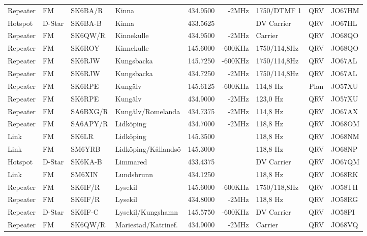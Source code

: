 \begin{longtable}{llllrrlcl}
Repeater & FM     & SK6BA/R  & Kinna               & 434.9500  & -2MHz   & 1750/DTMF 1     & QRV  & JO67HM \\
Hotspot  & D-Star & SK6BA-B  & Kinna               & 433.5625  &         & DV Carrier      & QRV  & JO67HL \\
Repeater & FM     & SK6QW/R  & Kinnekulle          & 434.9500  & -2MHz   & Carrier         & QRV  & JO68QO \\
Repeater & FM     & SK6ROY   & Kinnekulle          & 145.6000  & -600KHz & 1750/114,8Hz    & QRV  & JO68QO \\
Repeater & FM     & SK6RJW   & Kungsbacka          & 145.7250  & -600KHz & 1750/114,8Hz    & QRV  & JO67AL \\
Repeater & FM     & SK6RJW   & Kungsbacka          & 434.7250  & -2MHz   & 1750/114,8Hz    & QRV  & JO67AL \\
Repeater & FM     & SK6RPE   & Kungälv             & 145.6125  & -600KHz & 114,8 Hz        & Plan & JO57XU \\
Repeater & FM     & SK6RPE   & Kungälv             & 434.9000  & -2MHz   & 123,0 Hz        & QRV  & JO57XU \\
Repeater & FM     & SA6BXG/R & Kungälv/Romelanda   & 434.7375  & -2MHz   & 114,8 Hz        & QRV  & JO67AX \\
Repeater & FM     & SA6APY/R & Lidköping           & 434.7000  & -2MHz   & 118,8 Hz        & QRV  & JO68OM \\
Link     & FM     & SK6LR    & Lidköping           & 145.3500  &         & 118,8 Hz        & QRV  & JO68NM \\
Link     & FM     & SM6YRB   & Lidköping/Kållandsö & 145.3000  &         & 118,8 Hz        & QRV  & JO68NP \\
Hotspot  & D-Star & SK6KA-B  & Limmared            & 433.4375  &         & DV Carrier      & QRV  & JO67QM \\
Link     & FM     & SM6XIN   & Lundsbrunn          & 434.1250  &         & 118,8 Hz        & QRV  & JO68RK \\
Repeater & FM     & SK6IF/R  & Lysekil             & 145.6000  & -600KHz & 1750/118,8Hz    & QRV  & JO58TH \\
Repeater & FM     & SK6IF/R  & Lysekil             & 434.8000  & -2MHz   & 118,8 Hz        & QRV  & JO58RG \\
Repeater & D-Star & SK6IF-C  & Lysekil/Kungshamn   & 145.5750  & -600KHz & DV Carrier      & QRV  & JO58PI \\
Repeater & FM     & SK6QW/R  & Mariestad/Katrinef. & 434.9000  & -2MHz   & Carrier         & QRV  & JO68VQ \\

\end{longtable}

